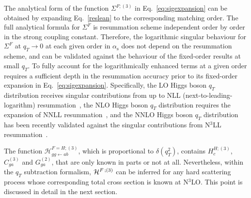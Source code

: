 \documentclass[12pt]{article}
\DeclareRobustCommand{\as}{\ensuremath{\alpha_{\mathrm{s}}}}
\DeclareRobustCommand{\qt}{q_T}
\begin{document}
The analytical form of the function $\Sigma^{F;(3)}$ in Eq.~\eqref{eq:sigexpansion} can be obtained by expanding Eq.~\eqref{reslean} to the corresponding matching order. The full analytical formula for $\Sigma^{F}$ is resummation scheme independent order by order in the strong coupling constant. Therefore, the logarithmic singular behaviour for $\Sigma^{F}$ at $\qt\rightarrow 0$ at 
each given order in $\as$ does not depend on the 
resummation scheme, and can be validated against the behaviour of the fixed-order results at small $\qt$. To fully 
account for the logarithmically enhanced terms at a given order requires a sufficient depth in the resummation accuracy prior to 
its fixed-order expansion in Eq.~\eqref{eq:sigexpansion}. Specifically, the LO Higgs boson $\qt$ distribution receives singular contributions from up to NLL (next-to-leading-logarithm) resummation~\cite{Catani:1988vd,Kauffman:1991cx}, the NLO Higgs boson $\qt$ distribution requires the expansion of NNLL resummation~\cite{deFlorian:2001zd,deFlorian:2000pr,Becher:2012yn,Neill:2015roa}, and the NNLO Higgs boson $\qt$ distribution has been recently validated against the singular contributions from N$^3$LL resummation~\cite{Chen:2018pzu,Bizon:2018foh}. 

The function $\mathcal{H}^{F=H;(3)}_{gg\leftarrow ab}$, which is proportional to $\delta(q^{2}_{T})$, contains $H^{H;(3)}_{c}$, $C^{(3)}_{ga}$ and $G^{(2)}_{ga}$,  that are only known in parts or not at all. Nevertheless, within the $\qt$ subtraction  formalism, ${\cal H}^{F \,;(3)}$ can be inferred for any hard scattering process whose corresponding total cross section is known at N$^{3}$LO. This point is discussed in detail in the next section.


\setcounter{footnote}{0}
\end{document}
